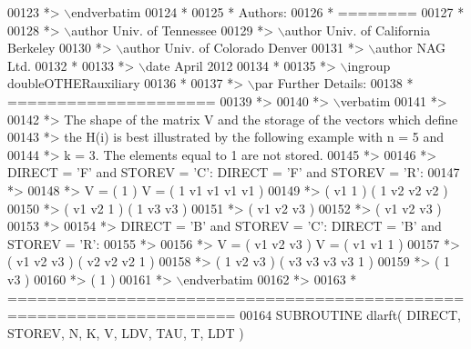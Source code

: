 \begin{DoxyCode}
00123 \textcolor{comment}{*> \(\backslash\)endverbatim}
00124 \textcolor{comment}{*}
00125 \textcolor{comment}{*  Authors:}
00126 \textcolor{comment}{*  ========}
00127 \textcolor{comment}{*}
00128 \textcolor{comment}{*> \(\backslash\)author Univ. of Tennessee }
00129 \textcolor{comment}{*> \(\backslash\)author Univ. of California Berkeley }
00130 \textcolor{comment}{*> \(\backslash\)author Univ. of Colorado Denver }
00131 \textcolor{comment}{*> \(\backslash\)author NAG Ltd. }
00132 \textcolor{comment}{*}
00133 \textcolor{comment}{*> \(\backslash\)date April 2012}
00134 \textcolor{comment}{*}
00135 \textcolor{comment}{*> \(\backslash\)ingroup doubleOTHERauxiliary}
00136 \textcolor{comment}{*}
00137 \textcolor{comment}{*> \(\backslash\)par Further Details:}
00138 \textcolor{comment}{*  =====================}
00139 \textcolor{comment}{*>}
00140 \textcolor{comment}{*> \(\backslash\)verbatim}
00141 \textcolor{comment}{*>}
00142 \textcolor{comment}{*>  The shape of the matrix V and the storage of the vectors which define}
00143 \textcolor{comment}{*>  the H(i) is best illustrated by the following example with n = 5 and}
00144 \textcolor{comment}{*>  k = 3. The elements equal to 1 are not stored.}
00145 \textcolor{comment}{*>}
00146 \textcolor{comment}{*>  DIRECT = 'F' and STOREV = 'C':         DIRECT = 'F' and STOREV = 'R':}
00147 \textcolor{comment}{*>}
00148 \textcolor{comment}{*>               V = (  1       )                 V = (  1 v1 v1 v1 v1 )}
00149 \textcolor{comment}{*>                   ( v1  1    )                     (     1 v2 v2 v2 )}
00150 \textcolor{comment}{*>                   ( v1 v2  1 )                     (        1 v3 v3 )}
00151 \textcolor{comment}{*>                   ( v1 v2 v3 )}
00152 \textcolor{comment}{*>                   ( v1 v2 v3 )}
00153 \textcolor{comment}{*>}
00154 \textcolor{comment}{*>  DIRECT = 'B' and STOREV = 'C':         DIRECT = 'B' and STOREV = 'R':}
00155 \textcolor{comment}{*>}
00156 \textcolor{comment}{*>               V = ( v1 v2 v3 )                 V = ( v1 v1  1       )}
00157 \textcolor{comment}{*>                   ( v1 v2 v3 )                     ( v2 v2 v2  1    )}
00158 \textcolor{comment}{*>                   (  1 v2 v3 )                     ( v3 v3 v3 v3  1 )}
00159 \textcolor{comment}{*>                   (     1 v3 )}
00160 \textcolor{comment}{*>                   (        1 )}
00161 \textcolor{comment}{*> \(\backslash\)endverbatim}
00162 \textcolor{comment}{*>}
00163 \textcolor{comment}{*  =====================================================================}
00164 \textcolor{keyword}{      SUBROUTINE }dlarft( DIRECT, STOREV, N, K, V, LDV, TAU, T, LDT )

\end{DoxyCode}
